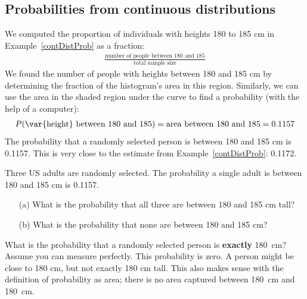 

\subsection{Probabilities from continuous distributions}

We computed the proportion of individuals with heights 180 to 185 cm in Example~\ref{contDistProb} as a fraction:
\begin{eqnarray*}
\frac{\text{number of people between 180 and 185}}{\text{total sample size}}
\end{eqnarray*}
We found the number of people with heights between 180 and 185 cm by determining the fraction of the histogram's area in this region. Similarly, we can use the area in the shaded region under the curve to find a probability (with the help of a computer):
\begin{eqnarray*}
P(\text{\var{height} between 180 and 185})
	= \text{area between 180 and 185}
	= 0.1157
\end{eqnarray*}
The probability that a randomly selected person is between 180 and 185 cm is 0.1157. This is very close to the estimate from Example~\ref{contDistProb}: 0.1172.


\begin{exercisewrap}
\begin{nexercise}
Three US adults are randomly selected. The probability a single adult is between 180 and 185 cm is 0.1157.\footnotemark \vspace{-1.5mm}
\begin{enumerate}
\setlength{\itemsep}{0mm}
\item[(a)] What is the probability that all three are between 180 and 185 cm tall?
\item[(b)] What is the probability that none are between 180 and 185 cm?
\end{enumerate}
\end{nexercise}
\end{exercisewrap}

\D{\newpage}

\begin{examplewrap}
\begin{nexample}{What is the probability that a randomly selected person is \textbf{exactly} 180~cm? Assume you can measure perfectly.}
\label{probabilityOfExactly180cm}
This probability is zero. A person might be close to 180 cm, but not exactly 180 cm tall. This also makes sense with the definition of probability as area; there is no area captured between 180~cm and 180~cm.
\end{nexample}
\end{examplewrap}

